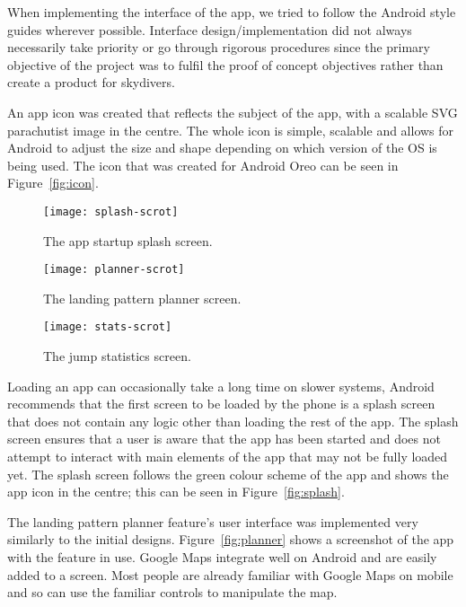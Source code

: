 When implementing the interface of the app, we tried to follow the Android style guides wherever possible. Interface design/implementation did not always necessarily take priority or go through rigorous procedures since the primary objective of the project was to fulfil the proof of concept objectives rather than create a product for skydivers.

An app icon was created that reflects the subject of the app, with a scalable SVG parachutist image in the centre. The whole icon is simple, scalable and allows for Android to adjust the size and shape depending on which version of the OS is being used. The icon that was created for Android Oreo can be seen in Figure~\vref{fig:icon}.

\begin{figure}[ht]
  \centering
  \captionsetup{width=0.24\textwidth}
  \begin{minipage}[b]{0.25\textwidth}
    \texttt{[image: splash-scrot]}
    \caption{The app startup splash screen.}\label{fig:splash}
  \end{minipage}%
  \hspace{1.5cm}
  \begin{minipage}[b]{0.25\textwidth}
    \texttt{[image: planner-scrot]}
    \caption{The landing pattern planner screen.}\label{fig:planner}
  \end{minipage}%
  \hspace{1.5cm}
  \begin{minipage}[b]{0.25\textwidth}
    \texttt{[image: stats-scrot]}
    \caption{The jump statistics screen.}\label{fig:stats}
  \end{minipage}
\end{figure}

Loading an app can occasionally take a long time on slower systems, Android recommends that the first screen to be loaded by the phone is a splash screen that does not contain any logic other than loading the rest of the app. The splash screen ensures that a user is aware that the app has been started and does not attempt to interact with main elements of the app that may not be fully loaded yet. The splash screen follows the green colour scheme of the app and shows the app icon in the centre; this can be seen in Figure~\vref{fig:splash}.

The landing pattern planner feature's user interface was implemented very similarly to the initial designs. Figure~\vref{fig:planner} shows a screenshot of the app with the feature in use. Google Maps integrate well on Android and are easily added to a screen. Most people are already familiar with Google Maps on mobile and so can use the familiar controls to manipulate the map.

